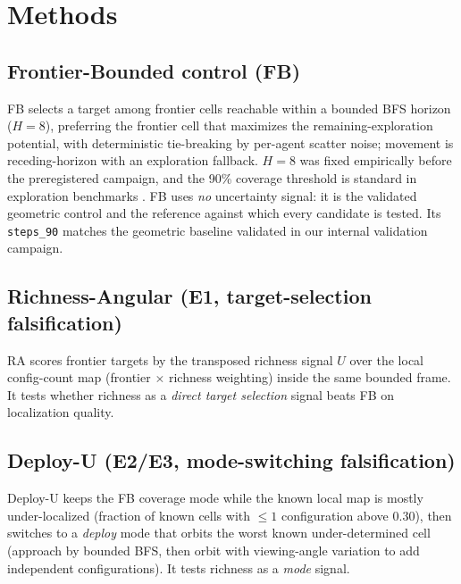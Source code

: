 \documentclass[journal]{IEEEtran}
\begin{document}
\section{Methods}
\subsection{Frontier-Bounded control (FB)}
FB selects a target among frontier cells reachable within a bounded BFS
horizon ($H = 8$), preferring the frontier cell that maximizes the
remaining-exploration potential, with deterministic tie-breaking by per-agent
scatter noise; movement is receding-horizon with an exploration fallback.
$H = 8$ was fixed empirically before the preregistered campaign, and the 90\%
coverage threshold is standard in exploration benchmarks
\cite{Yamauchi1997, Burgard2005}. FB uses \emph{no} uncertainty signal: it is
the validated geometric control and the reference against which every
candidate is tested. Its \texttt{steps\_90} matches the geometric baseline
validated in our internal validation campaign.

\subsection{Richness-Angular (E1, target-selection falsification)}
RA scores frontier targets by the transposed richness signal $U$ over the local
config-count map (frontier $\times$ richness weighting) inside the same bounded
frame. It tests whether richness as a \emph{direct target selection} signal
beats FB on localization quality.

\subsection{Deploy-U (E2/E3, mode-switching falsification)}
Deploy-U keeps the FB coverage mode while the known local map is mostly
under-localized (fraction of known cells with $\leq 1$ configuration above
0.30), then switches to a \emph{deploy} mode that orbits the worst known
under-determined cell (approach by bounded BFS, then orbit with viewing-angle
variation to add independent configurations). It tests richness as a
\emph{mode} signal.
\end{document}
